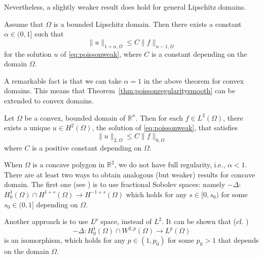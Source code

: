 Nevertheless, a slightly weaker result does hold for general Lipschitz domains.
\begin{theorem}
Assume that $\Omega$ is a bounded Lipschitz domain. Then there exists a constant
$\alpha\in(0, 1]$ such that
\[
\|u\|_{1+\alpha,\Omega}\leq C\|f\|_{\alpha-1,\Omega}
\]
for the solution $u$ of \eqref{eq:poissonweak},
where $C$ is a constant depending on the domain $\Omega$.
\end{theorem}

A remarkable fact is that we can take $\alpha = 1$ in the above theorem for
convex domains. This means that Theorem~\ref{thm:poissonregularitysmooth} can be extended to convex domains.
\begin{theorem}\label{thm:poissonregularityconvex}
Let $\Omega$ be a convex, bounded domain of $\mathbb R^n$. Then for each $f \in L^2(\Omega)$,
there exists a unique $u\in H^2(\Omega)$, the solution of \eqref{eq:poissonweak}, that satisfies
\[
\|u\|_{2,\Omega}\leq C\|f\|_{0,\Omega}
\]
where $C$ is a positive constant depending on $\Omega$.
\end{theorem}

When $\Omega$ is a concave polygon in $\mathbb R^2$, we do not have full regularity, i.e.,
$\alpha < 1$. There are at least two ways to obtain analogous (but weaker) results for concave
domain. The first one (see \cite{Dauge1988,BacutaBrambleXu2003}) is to use fractional Sobolev spaces: namely $-\Delta$:
$H_0^1(\Omega)\cap H^{1+s}(\Omega)\to H^{-1+s}(\Omega)$ which holds for any $s\in [0, s_0)$ for some $s_0\in (0, 1]$
depending on $\Omega$.

Another approach is to use $L^p$ space, instead of $L^2$. It can be shown that (cf. \cite{Grisvard1985})
\[
-\Delta: H_0^1(\Omega)\cap W^{2,p}(\Omega)\to L^{p}(\Omega)
\]
is an isomorphism, which holds for any $p\in(1, p_0)$ for some $p_0 > 1$ that depends on the domain $\Omega$.
